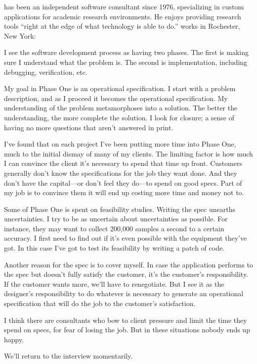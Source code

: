 \begin{interview}
\noindent {} has been an independent software
consultant since 1976, specializing in custom applications for
academic research environments.  He enjoys providing research tools
``right at the edge of what technology is able to do.''
 works in Rochester, New York:

\begin{tfquot}
I see the software development process as having two phases. The first is
making sure I understand what the problem is. The second is
implementation, including debugging, verification, etc.

My goal in Phase One is an operational specification. I start with a
problem description, and as I proceed it becomes the operational
specification. My understanding of the problem metamorphoses into a
solution. The better the understanding, the more complete the
solution. I look for closure; a sense of having no more questions that
aren't answered in print.

I've found that on each project I've been putting more time into Phase
One, much to the initial dismay of many of my clients. The limiting
factor is how
much I can convince the client it's necessary to spend that time up
front.  Customers generally don't know the specifications for the job
they want done. And they don't have the capital---or don't feel they
do---to spend on good specs. Part of my job is to convince them it
will end up costing more time and money not to.

Some of Phase One is spent on feasibility studies. Writing the spec
unearths uncertainties. I try to be as uncertain about uncertainties
as possible. For instance, they may want to collect 200,000 samples a
second to a certain accuracy. I first need to find out if it's even
possible with the equipment they've got. In this case I've got to test
its feasibility by writing a patch of code.

Another reason for the spec is to cover myself. In case the
application performs to the spec but doesn't fully satisfy the
customer, it's the customer's responsibility. If the customer wants
more, we'll have to renegotiate. But I see it as the designer's
responsibility to do whatever is necessary to generate an operational
specification that will do the job to the customer's satisfaction.

I think there are consultants who bow to client pressure and limit the
time they spend on specs, for fear of losing the job. But in these
situations nobody ends up happy.
\end{tfquot}
\end{interview}%
We'll return to the  interview momentarily.%
%

